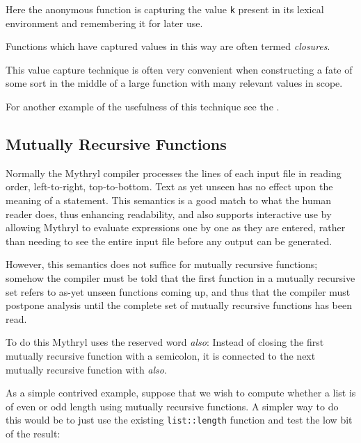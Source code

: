Here the anonymous function is capturing the value {\tt k} 
present in its lexical environment and remembering it for 
later use. 

Functions which have captured values in this way are 
often termed {\it closures}.

This value capture technique is often very convenient when 
constructing a fate of some sort in the middle of 
a large function with many relevant values in scope.

For another example of the usefulness of this technique see the 
.


\cutend*

\subsection{Mutually Recursive Functions}
\label{section:ref:functions:mutuall-recursive-functions}

Normally the Mythryl compiler processes the lines of each input file 
in reading order, left-to-right, top-to-bottom.  Text as yet unseen 
has no effect upon the meaning of a statement.  This semantics is a 
good match to what the human reader does, thus enhancing readability, 
and  also supports interactive use by allowing Mythryl to evaluate 
expressions one by one as they are entered, rather than needing to 
see the entire input file before any output can be generated.

However, this semantics does not suffice for mutually recursive 
functions;  somehow the compiler must be told that the first 
function in a mutually recursive set refers to as-yet unseen 
functions coming up, and thus that the compiler must postpone 
analysis until the complete set of mutually recursive functions 
has been read.

To do this Mythryl uses the reserved word {\it also}:  Instead 
of closing the first mutually recursive function with a semicolon, 
it is connected to the next mutually recursive function with {\it also}.

As a simple contrived example, suppose that we wish to compute 
whether a list is of even or odd length using mutually recursive 
functions.  A simpler way to do this would be to just use the 
existing {\tt list::length} function and test the low bit of 
the result:

